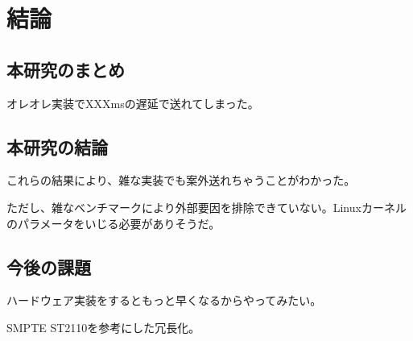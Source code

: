 \chapter{結論}
\label{chap:conclusion}

\section{本研究のまとめ}
\label{section:conclusion}

オレオレ実装でXXXmsの遅延で送れてしまった。

\section{本研究の結論}

これらの結果により、雑な実装でも案外送れちゃうことがわかった。

ただし、雑なベンチマークにより外部要因を排除できていない。Linuxカーネルのパラメータをいじる必要がありそうだ。

\section{今後の課題}

ハードウェア実装をするともっと早くなるからやってみたい。

SMPTE ST2110を参考にした冗長化。
